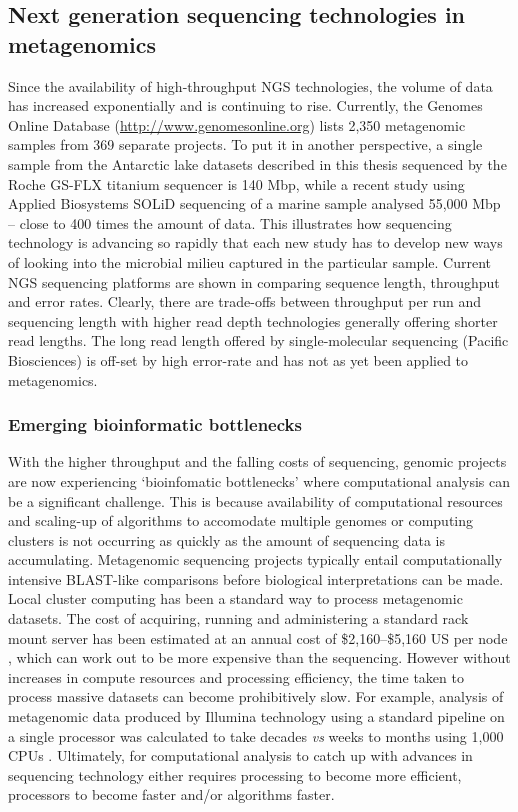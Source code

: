 \subsection{Next generation sequencing technologies in metagenomics}
Since the availability of high-throughput \ac{NGS} technologies, the volume of data has increased exponentially and is continuing to rise.
Currently, the Genomes Online Database (\url{http://www.genomesonline.org}) lists 2,350 metagenomic samples from 369 separate projects.
To put it in another perspective, a single sample from the Antarctic lake datasets described in this thesis sequenced by the Roche GS-FLX titanium sequencer is 140 Mbp, while a recent study using Applied Biosystems SOLiD sequencing of a marine sample \cite{Iverson2012} analysed 55,000 Mbp -- close to 400 times the amount of data.
This illustrates how sequencing technology is advancing so rapidly that each new study has to develop new ways of looking into the microbial milieu captured in the particular sample.
Current \ac{NGS} sequencing platforms are shown in  comparing sequence length, throughput and error rates.
Clearly, there are trade-offs between throughput per run and sequencing length with higher read depth technologies generally offering shorter read lengths. 
The long read length offered by single-molecular sequencing (Pacific Biosciences) is off-set by high error-rate and has not as yet been applied to metagenomics.


\subsubsection{Emerging bioinformatic bottlenecks}
With the higher throughput and the falling costs of sequencing, genomic projects are now experiencing `bioinfomatic bottlenecks' where computational analysis can be a significant challenge.
This is because availability of computational resources and scaling-up of algorithms to accomodate multiple genomes or computing clusters is not occurring as quickly as the amount of sequencing data is accumulating.
Metagenomic sequencing projects typically entail computationally intensive \acs{BLAST}-like comparisons before biological interpretations can be made.
Local cluster computing has been a standard way to process metagenomic datasets.
The cost of acquiring, running and administering a standard rack mount server has been estimated at an annual cost of \$2,160--\$5,160 US per node \cite{Wilkening2009}, which can work out to be more expensive than the sequencing.
However without increases in compute resources and processing efficiency, the time taken to process massive datasets can become prohibitively slow.
For example, analysis of metagenomic data produced by Illumina technology using a standard pipeline on a single processor was calculated to take decades \emph{vs} weeks to months using 1,000 CPUs \cite{Evanko2009}.
Ultimately, for computational analysis to catch up with advances in sequencing technology either requires processing to become more efficient, processors to become faster and/or algorithms faster.

